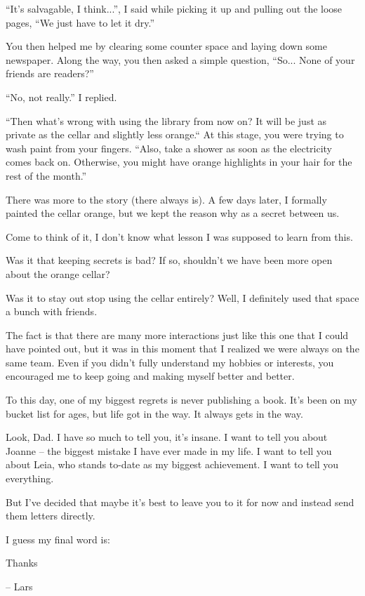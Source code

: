 ``It's salvagable, I think...'', I said while picking it up and pulling out the loose pages, ``We just have to let it dry.''

You then helped me by clearing some counter space and laying down some newspaper.
Along the way, you then asked a simple question, ``So... None of your friends are readers?''

``No, not really.'' I replied.

``Then what's wrong with using the library from now on? It will be just as private as the cellar and slightly less orange.`` At this stage, you were trying to wash paint from your fingers. ``Also, take a shower as soon as the electricity comes back on. Otherwise, you might have orange highlights in your hair for the rest of the month.''

There was more to the story (there always is).
A few days later, I formally painted the cellar orange, but we kept the reason why as a secret between us.

Come to think of it, I don't know what lesson I was supposed to learn from this.

Was it that keeping secrets is bad?
If so, shouldn't we have been more open about the orange cellar?

Was it to stay out stop using the cellar entirely?
Well, I definitely used that space a bunch with friends.

The fact is that there are many more interactions just like this one that I could have pointed out, but it was in this moment that I realized we were always on the same team.
Even if you didn't fully understand my hobbies or interests, you encouraged me to keep going and making myself better and better.

To this day, one of my biggest regrets is never publishing a book.
It's been on my bucket list for ages, but life got in the way.
It always gets in the way.

Look, Dad.
I have so much to tell you, it's insane.
I want to tell you about Joanne -- the biggest mistake I have ever made in my life.
I want to tell you about Leia, who stands to-date as my biggest achievement.
I want to tell you everything.

But I've decided that maybe it's best to leave you to it for now and instead send them letters directly.

I guess my final word is:

\huge{Thanks}

\normalsize{-- Lars}
